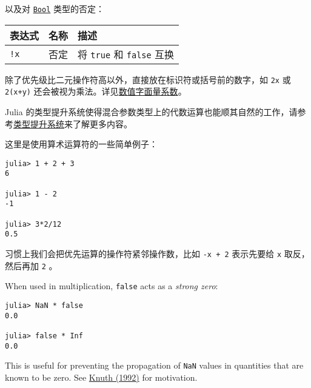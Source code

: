 以及对 \hyperlink{46725311238864537}{\texttt{Bool}} 类型的否定：




\begin{table}[h]

\begin{tabulary}{\linewidth}{|L|L|L|}
\hline
表达式 & 名称 & 描述 \\
\hline
\texttt{!x} & 否定 & 将 \texttt{true} 和 \texttt{false} 互换 \\
\hline
\end{tabulary}

\end{table}



除了优先级比二元操作符高以外，直接放在标识符或括号前的数字，如 \texttt{2x} 或 \texttt{2(x+y)} 还会被视为乘法。详见\hyperlink{7285052708387693199}{数值字面量系数}。



Julia 的类型提升系统使得混合参数类型上的代数运算也能顺其自然的工作，请参考\hyperlink{10374023657104680331}{类型提升系统}来了解更多内容。



这里是使用算术运算符的一些简单例子：




\begin{verbatim}
julia> 1 + 2 + 3
6

julia> 1 - 2
-1

julia> 3*2/12
0.5
\end{verbatim}



习惯上我们会把优先运算的操作符紧邻操作数，比如 \texttt{-x + 2} 表示先要给 \texttt{x}  取反，然后再加 \texttt{2} 。



When used in multiplication, \texttt{false} acts as a \emph{strong zero}:




\begin{verbatim}
julia> NaN * false
0.0

julia> false * Inf
0.0
\end{verbatim}



This is useful for preventing the propagation of \texttt{NaN} values in quantities that are known to be zero. See \href{https://arxiv.org/abs/math/9205211}{Knuth (1992)} for motivation.



\hypertarget{17155361622718020970}{}


